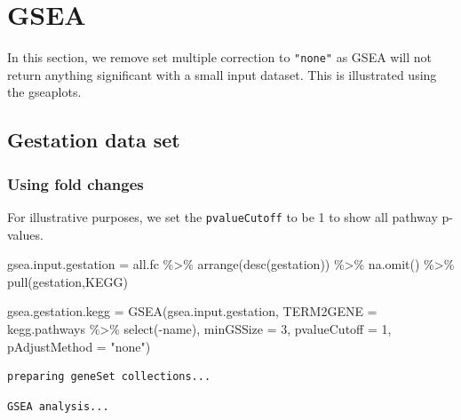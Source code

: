 \documentclass[
  24px,
  letterpaper,
  DIV=11,
  numbers=noendperiod]{scrartcl}
\newenvironment{Shaded}{\begin{snugshade}}{\end{snugshade}}
\newcommand{\AttributeTok}[1]{\textcolor[rgb]{0.40,0.45,0.13}{#1}}
\newcommand{\DecValTok}[1]{\textcolor[rgb]{0.68,0.00,0.00}{#1}}
\newcommand{\FunctionTok}[1]{\textcolor[rgb]{0.28,0.35,0.67}{#1}}
\newcommand{\NormalTok}[1]{\textcolor[rgb]{0.00,0.23,0.31}{#1}}
\newcommand{\OtherTok}[1]{\textcolor[rgb]{0.00,0.23,0.31}{#1}}
\newcommand{\SpecialCharTok}[1]{\textcolor[rgb]{0.37,0.37,0.37}{#1}}
\newcommand{\StringTok}[1]{\textcolor[rgb]{0.13,0.47,0.30}{#1}}
\begin{document}
\hypertarget{gsea}{%
\section{GSEA}\label{gsea}}

In this section, we remove set multiple correction to \texttt{"none"} as
GSEA will not return anything significant with a small input dataset.
This is illustrated using the gseaplots.

\hypertarget{gestation-data-set-1}{%
\subsection{Gestation data set}\label{gestation-data-set-1}}

\hypertarget{using-fold-changes}{%
\subsubsection{Using fold changes}\label{using-fold-changes}}

For illustrative purposes, we set the \texttt{pvalueCutoff} to be 1 to
show all pathway p-values.

\begin{Shaded}
\begin{Highlighting}[]
\NormalTok{gsea.input.gestation }\OtherTok{=}\NormalTok{ all.fc }\SpecialCharTok{\%\textgreater{}\%} 
  \FunctionTok{arrange}\NormalTok{(}\FunctionTok{desc}\NormalTok{(gestation)) }\SpecialCharTok{\%\textgreater{}\%} 
  \FunctionTok{na.omit}\NormalTok{() }\SpecialCharTok{\%\textgreater{}\%}
  \FunctionTok{pull}\NormalTok{(gestation,KEGG) }

\NormalTok{gsea.gestation.kegg }\OtherTok{=} \FunctionTok{GSEA}\NormalTok{(gsea.input.gestation, }
                           \AttributeTok{TERM2GENE =}\NormalTok{ kegg.pathways }\SpecialCharTok{\%\textgreater{}\%} \FunctionTok{select}\NormalTok{(}\SpecialCharTok{{-}}\NormalTok{name),}
                           \AttributeTok{minGSSize =} \DecValTok{3}\NormalTok{, }\AttributeTok{pvalueCutoff =} \DecValTok{1}\NormalTok{,}
                           \AttributeTok{pAdjustMethod =} \StringTok{"none"}\NormalTok{)}
\end{Highlighting}
\end{Shaded}

\begin{verbatim}
preparing geneSet collections...
\end{verbatim}

\begin{verbatim}
GSEA analysis...
\end{verbatim}
\end{document}
